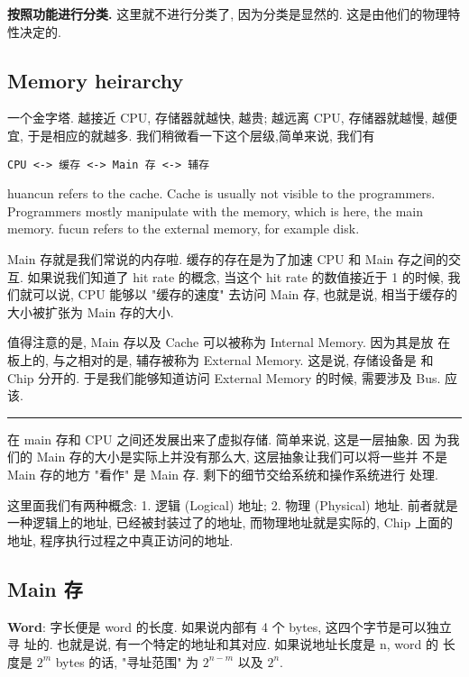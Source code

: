 \documentclass[11pt]{article}
\begin{document}
\textbf{按照功能进行分类.} 这里就不进行分类了, 因为分类是显然的. 这是由他们的物理特性决定的.

\subsection{Memory heirarchy}
\label{sec:org462d060}

一个金字塔. 越接近 CPU, 存储器就越快, 越贵; 越远离 CPU, 存储器就越慢, 越便宜, 于是相应的就越多. 我们稍微看一下这个层级,简单来说, 我们有

\begin{verbatim}
CPU <-> 缓存 <-> Main 存 <-> 辅存
\end{verbatim}

huancun refers to the cache. Cache is usually not visible to the programmers. Programmers mostly manipulate with the memory, which is here, the main memory. fucun refers to the external memory, for example disk.

Main 存就是我们常说的内存啦. 缓存的存在是为了加速 CPU 和 Main 存之间的交互. 如果说我们知道了 hit rate 的概念, 当这个 hit rate 的数值接近于 1 的时候, 我们就可以说, CPU 能够以 "缓存的速度" 去访问 Main 存, 也就是说, 相当于缓存的大小被扩张为 Main 存的大小.

值得注意的是, Main 存以及 Cache 可以被称为 Internal Memory. 因为其是放
在板上的, 与之相对的是, 辅存被称为 External Memory. 这是说, 存储设备是
和 Chip 分开的. 于是我们能够知道访问 External Memory 的时候, 需要涉及
Bus. 应该.

\noindent\rule{\textwidth}{0.5pt}

在 main 存和 CPU 之间还发展出来了虚拟存储. 简单来说, 这是一层抽象.  因
为我们的 Main 存的大小是实际上并没有那么大, 这层抽象让我们可以将一些并
不是 Main 存的地方 "看作" 是 Main 存. 剩下的细节交给系统和操作系统进行
处理.

这里面我们有两种概念: 1. 逻辑 (Logical) 地址; 2. 物理 (Physical) 地址.
前者就是一种逻辑上的地址, 已经被封装过了的地址, 而物理地址就是实际的,
Chip 上面的地址, 程序执行过程之中真正访问的地址.

\subsection{Main 存}
\label{sec:orgd7dac4f}

\textbf{Word}: 字长便是 word 的长度. 如果说内部有 4 个 bytes, 这四个字节是可以独立寻
址的. 也就是说, 有一个特定的地址和其对应. 如果说地址长度是 n, word 的
长度是 \(2^m\)  bytes 的话, "寻址范围" 为 \(2^{n-m}\) 以及 \(2^n\).
\end{document}

